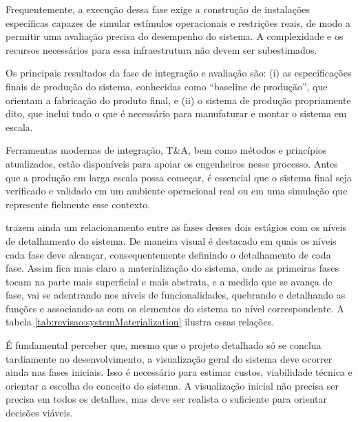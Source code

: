 	Frequentemente, a execução dessa fase exige a construção de instalações específicas capazes de simular estímulos operacionais e restrições reais, de modo a 
	permitir uma avaliação precisa do desempenho do sistema. A complexidade e os recursos necessários para essa infraestrutura não devem ser subestimados.

	Os principais resultados da fase de integração e avaliação são: (i) as especificações finais de produção do sistema, conhecidas como ``baseline de produção'', 
	que orientam a fabricação do produto final, e (ii) o sistema de produção propriamente dito, que inclui tudo o que é necessário para manufaturar e montar o 
	sistema em escala.

	Ferramentas modernas de integração, T\&A, bem como métodos e princípios atualizados, estão disponíveis para apoiar os engenheiros nesse processo. Antes que a 
	produção em larga escala possa começar, é essencial que o sistema final seja verificado e validado em um ambiente operacional real ou em uma simulação que represente 
	fielmente esse contexto.

	\vspace{1.5 cm} %
	
	\cite{kossiakoff2020systems} trazem ainda um relacionamento entre as fases desses dois estágios com os níveis de detalhamento do sistema. De maneira visual é destacado
	em quais os níveis cada fase deve alcançar, consequentemente definindo o detalhamento de cada fase. Assim fica mais claro a materialização do sistema, onde as primeiras fases tocam
	na parte mais superficial e mais abstrata, e a medida que se avança de fase, vai se adentrando nos níveis de funcionalidades, quebrando e detalhando as funções e associando-as com
	os elementos do sistema no nível correspondente. A tabela \ref{tab:revisao:systemMaterialization} ilustra essas relações.


	É fundamental perceber que, mesmo que o projeto detalhado só se conclua tardiamente no
	desenvolvimento, a visualização geral do sistema deve ocorrer ainda nas fases iniciais.
	Isso é necessário para estimar custos, viabilidade técnica e orientar a escolha do conceito do sistema.
	A visualização inicial não precisa ser precisa em todos os detalhes, mas deve ser realista o suficiente
	para orientar decisões viáveis.

